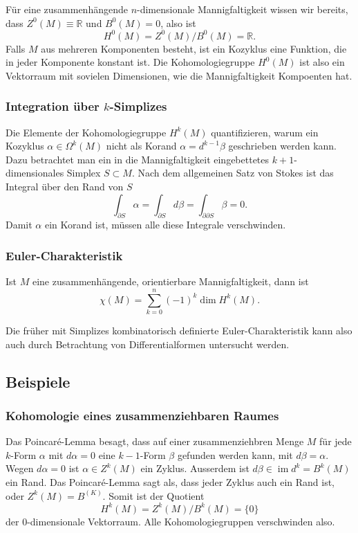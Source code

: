 Für eine zusammenhängende $n$-dimensionale Mannigfaltigkeit wissen wir
bereits, dass $Z^0(M)\equiv\mathbb{R}$ und $B^0(M)=0$, also ist
\[
H^0(M) = Z^0(M) / B^0(M) = \mathbb{R}.
\]
Falls $M$ aus mehreren Komponenten besteht, ist ein Kozyklus eine
Funktion, die in jeder Komponente konstant ist.
Die Kohomologiegruppe $H^0(M)$ ist also ein Vektorraum mit sovielen
Dimensionen, wie die Mannigfaltigkeit Kompoenten hat.

%
%
\subsubsection{Integration über $k$-Simplizes}
Die Elemente der Kohomologiegruppe $H^k(M)$ quantifizieren, warum
ein Kozyklus $\alpha\in \Omega^k(M)$ nicht als Korand $\alpha=d^{k-1}\beta$
geschrieben werden kann.
Dazu betrachtet man ein in die Mannigfaltigkeit eingebettetes
$k+1$-dimensionales Simplex $S\subset M$.
Nach dem allgemeinen Satz von Stokes ist das Integral über den Rand von
$S$
\[
\int_{\partial S} \alpha
=
\int_{\partial S} d\beta
=
\int_{\partial\partial S}\beta
=
0.
\]
Damit $\alpha$ ein Korand ist, müssen alle diese Integrale verschwinden.

%
%
\subsubsection{Euler-Charakteristik}

\begin{satz}
Ist $M$ eine zusammenhängende, orientierbare Mannigfaltigkeit, dann ist
\[
\chi(M)
=
\sum_{k=0}^n (-1)^k \dim H^k(M).
\]
\end{satz}

Die früher mit Simplizes kombinatorisch definierte Euler-Charakteristik
kann also auch durch Betrachtung von Differentialformen untersucht
werden.

%
%
\subsection{Beispiele}


%
%
\subsubsection{Kohomologie eines zusammenziehbaren Raumes}
Das Poincaré-Lemma besagt, dass auf einer zusammenziehbren Menge
$M$ für jede $k$-Form $\alpha$ mit $d\alpha=0$ eine $k-1$-Form
$\beta$ gefunden werden kann, mit $d\beta = \alpha$.
Wegen $d\alpha=0$ ist $\alpha\in Z^k(M)$ ein Zyklus.
Ausserdem ist $d\beta\in \operatorname{im}d^k = B^k(M)$ ein Rand.
Das Poincaré-Lemma sagt als, dass jeder Zyklus auch ein Rand ist,
oder $Z^k(M) = B^(K)$.
Somit ist der Quotient
\[
H^k(M)
=
Z^k(M) / B^k(M)
=
\{0\}
\]
der 0-dimensionale Vektorraum.
Alle Kohomologiegruppen verschwinden also.


